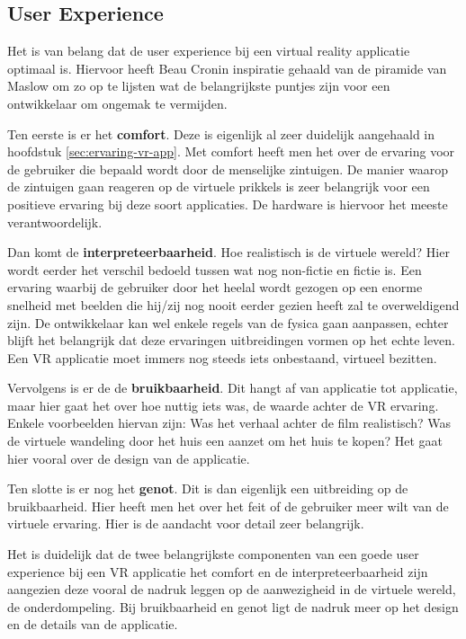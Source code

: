 \subsection{User Experience}
\label{subsec:user-experience}
Het is van belang dat de user experience bij een virtual reality applicatie optimaal is. Hiervoor heeft Beau Cronin \autocite{Cronin2015} inspiratie gehaald van de piramide van Maslow om zo op te lijsten wat de belangrijkste puntjes zijn voor een ontwikkelaar om ongemak te vermijden.

Ten eerste is er het \textbf{comfort}. Deze is eigenlijk al zeer duidelijk aangehaald in hoofdstuk \ref{sec:ervaring-vr-app}. Met comfort heeft men het over de ervaring voor de gebruiker die bepaald wordt door de menselijke zintuigen. De manier waarop de zintuigen gaan reageren op de virtuele prikkels is zeer belangrijk voor een positieve ervaring bij deze soort applicaties. De hardware is hiervoor het meeste verantwoordelijk.

Dan komt de \textbf{interpreteerbaarheid}. Hoe realistisch is de virtuele wereld? Hier wordt eerder het verschil bedoeld tussen wat nog non-fictie en fictie is. Een ervaring waarbij de gebruiker door het heelal wordt gezogen op een enorme snelheid met beelden die hij/zij nog nooit eerder gezien heeft zal te overweldigend zijn. De ontwikkelaar kan wel enkele regels van de fysica gaan aanpassen, echter blijft het belangrijk dat deze ervaringen uitbreidingen vormen op het echte leven. Een VR applicatie moet immers nog steeds iets onbestaand, virtueel bezitten.

Vervolgens is er de de \textbf{bruikbaarheid}. Dit hangt af van applicatie tot applicatie, maar hier gaat het over hoe nuttig iets was, de waarde achter de VR ervaring. Enkele voorbeelden hiervan zijn: Was het verhaal achter de film realistisch? Was de virtuele wandeling door het huis een aanzet om het huis te kopen? Het gaat hier vooral over de design van de applicatie.

Ten slotte is er nog het \textbf{genot}. Dit is dan eigenlijk een uitbreiding op de bruikbaarheid. Hier heeft men het over het feit of de gebruiker meer wilt van de virtuele ervaring. Hier is de aandacht voor detail zeer belangrijk.

Het is duidelijk dat de twee belangrijkste componenten van een goede user experience bij een VR applicatie het comfort en de interpreteerbaarheid zijn aangezien deze vooral de nadruk leggen op de aanwezigheid in de virtuele wereld, de onderdompeling. Bij bruikbaarheid en genot ligt de nadruk meer op het design en de details van de applicatie.

